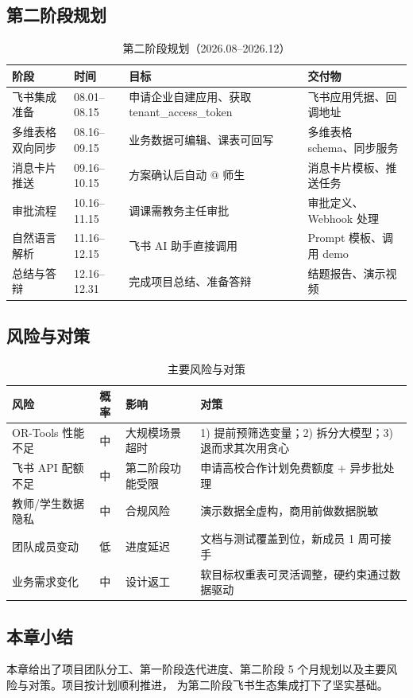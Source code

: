 \subsection{第二阶段规划}

\begin{table}[h]
\centering
\caption{第二阶段规划（2026.08--2026.12）}
\label{tab:phase2}
\small
\begin{tabularx}{\textwidth}{l l l X}
\toprule
\textbf{阶段} & \textbf{时间} & \textbf{目标} & \textbf{交付物} \\
\midrule
飞书集成准备
  & 08.01--08.15
  & 申请企业自建应用、获取 tenant\_access\_token
  & 飞书应用凭据、回调地址 \\
多维表格双向同步
  & 08.16--09.15
  & 业务数据可编辑、课表可回写
  & 多维表格 schema、同步服务 \\
消息卡片推送
  & 09.16--10.15
  & 方案确认后自动 @ 师生
  & 消息卡片模板、推送任务 \\
审批流程
  & 10.16--11.15
  & 调课需教务主任审批
  & 审批定义、Webhook 处理 \\
自然语言解析
  & 11.16--12.15
  & 飞书 AI 助手直接调用
  & Prompt 模板、调用 demo \\
总结与答辩
  & 12.16--12.31
  & 完成项目总结、准备答辩
  & 结题报告、演示视频 \\
\bottomrule
\end{tabularx}
\end{table}

\subsection{风险与对策}

\begin{table}[h]
\centering
\caption{主要风险与对策}
\label{tab:risk}
\small
\begin{tabularx}{\textwidth}{l c X X}
\toprule
\textbf{风险} & \textbf{概率} & \textbf{影响} & \textbf{对策} \\
\midrule
OR-Tools 性能不足
  & 中
  & 大规模场景超时
  & 1) 提前预筛选变量；2) 拆分大模型；3) 退而求其次用贪心 \\
飞书 API 配额不足
  & 中
  & 第二阶段功能受限
  & 申请高校合作计划免费额度 + 异步批处理 \\
教师/学生数据隐私
  & 中
  & 合规风险
  & 演示数据全虚构，商用前做数据脱敏 \\
团队成员变动
  & 低
  & 进度延迟
  & 文档与测试覆盖到位，新成员 1 周可接手 \\
业务需求变化
  & 中
  & 设计返工
  & 软目标权重表可灵活调整，硬约束通过数据驱动 \\
\bottomrule
\end{tabularx}
\end{table}

\subsection{本章小结}

本章给出了项目团队分工、第一阶段迭代进度、第二阶段
5 个月规划以及主要风险与对策。项目按计划顺利推进，
为第二阶段飞书生态集成打下了坚实基础。
